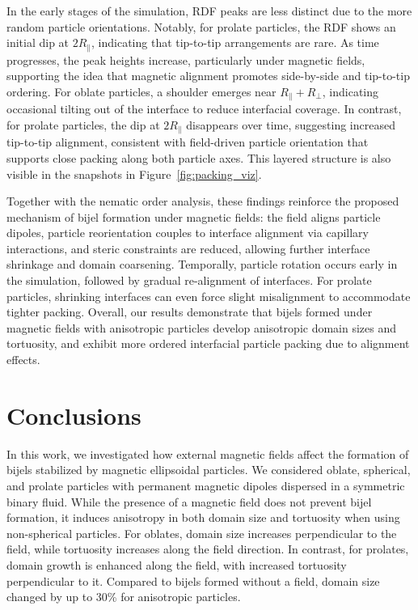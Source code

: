 In the early stages of the simulation, RDF peaks are less distinct due to the more random particle orientations. Notably, for prolate particles, 
the RDF shows an initial dip at \(2R_\parallel\), indicating that tip-to-tip arrangements are rare. As time progresses, the peak heights increase, 
particularly under magnetic fields, supporting the idea that magnetic alignment promotes side-by-side and tip-to-tip ordering. For oblate particles, 
a shoulder emerges near \(R_\parallel + R_\perp\), indicating occasional tilting out of the interface to reduce interfacial coverage. In contrast, 
for prolate particles, the dip at \(2R_\parallel\) disappears over time, suggesting increased tip-to-tip alignment, consistent with field-driven 
particle orientation that supports close packing along both particle axes. This layered structure is also visible in the snapshots in 
Figure~\ref{fig:packing_viz}.

Together with the nematic order analysis, these findings reinforce the proposed mechanism of bijel formation under magnetic fields: the field aligns 
particle dipoles, particle reorientation couples to interface alignment via capillary interactions, and steric constraints are reduced, allowing further 
interface shrinkage and domain coarsening. Temporally, particle rotation occurs early in the simulation, followed by gradual re-alignment of interfaces. 
For prolate particles, shrinking interfaces can even force slight misalignment to accommodate tighter packing. Overall, our results demonstrate that 
bijels formed under magnetic fields with anisotropic particles develop anisotropic domain sizes and tortuosity, and exhibit more ordered interfacial 
particle packing due to alignment effects.
    
\section{Conclusions}

In this work, we investigated how external magnetic fields affect the formation of bijels stabilized by magnetic ellipsoidal particles. We considered 
oblate, spherical, and prolate particles with permanent magnetic dipoles dispersed in a symmetric binary fluid. While the presence of a magnetic field 
does not prevent bijel formation, it induces anisotropy in both domain size and tortuosity when using non-spherical particles. For oblates, domain size 
increases perpendicular to the field, while tortuosity increases along the field direction. In contrast, for prolates, domain growth is enhanced along 
the field, with increased tortuosity perpendicular to it. Compared to bijels formed without a field, domain size changed by up to 30\% for anisotropic particles.

